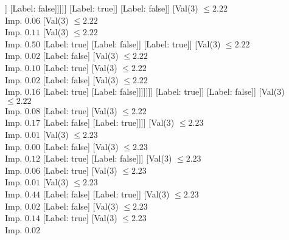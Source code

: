 \documentclass[margin=10pt]{standalone}
\begin{document}
\begin{forest}
																										]
																									[Label: false]]]]]
																					[Label: true]]
																				[Label: false]]
																			[Val($3$) $ \leq 2.22$ \\ Imp. $0.06$
																				[Val($3$) $ \leq 2.22$ \\ Imp. $0.11$
																					[Val($3$) $ \leq 2.22$ \\ Imp. $0.50$
																						[Label: true]
																						[Label: false]]
																					[Label: true]]
																				[Val($3$) $ \leq 2.22$ \\ Imp. $0.02$
																					[Label: false]
																					[Val($3$) $ \leq 2.22$ \\ Imp. $0.10$
																						[Label: true]
																						[Val($3$) $ \leq 2.22$ \\ Imp. $0.02$
																							[Label: false]
																							[Val($3$) $ \leq 2.22$ \\ Imp. $0.16$
																								[Label: true]
																								[Label: false]]]]]]]
																		[Label: true]]
																	[Label: false]]
																[Val($3$) $ \leq 2.22$ \\ Imp. $0.08$
																	[Label: true]
																	[Val($3$) $ \leq 2.22$ \\ Imp. $0.17$
																		[Label: false]
																		[Label: true]]]]
															[Val($3$) $ \leq 2.23$ \\ Imp. $0.01$
																[Val($3$) $ \leq 2.23$ \\ Imp. $0.00$
																	[Label: false]
																	[Val($3$) $ \leq 2.23$ \\ Imp. $0.12$
																		[Label: true]
																		[Label: false]]]
																[Val($3$) $ \leq 2.23$ \\ Imp. $0.06$
																	[Label: true]
																	[Val($3$) $ \leq 2.23$ \\ Imp. $0.01$
																		[Val($3$) $ \leq 2.23$ \\ Imp. $0.44$
																			[Label: false]
																			[Label: true]]
																		[Val($3$) $ \leq 2.23$ \\ Imp. $0.02$
																			[Label: false]
																			[Val($3$) $ \leq 2.23$ \\ Imp. $0.14$
																				[Label: true]
																				[Val($3$) $ \leq 2.23$ \\ Imp. $0.02$

\end{forest}
\end{document}
